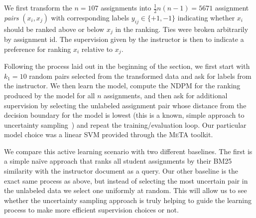 We first transform the $n = 107$ assignments into $\frac{1}{2}n(n-1) =
5671$ assignment \emph{pairs} $(x_i, x_j)$ with corresponding labels
$y_{ij} \in \{+1, -1\}$ indicating whether $x_i$ should be ranked above or
below $x_j$ in the ranking. Ties were broken arbitrarily by assignment id.
The supervision given by the instructor is then to indicate a preference
for ranking $x_i$ relative to $x_j$.

Following the process laid out in the beginning of the section, we first
start with $k_1 = 10$ random pairs selected from the transformed data and
ask for labels from the instructor. We then learn the model, compute the
NDPM for the ranking produced by the model for all $n$ assignments, and
then ask for additional supervision by selecting the unlabeled assignment
pair whose distance from the decision boundary for the model is lowest
(this is a known, simple approach to uncertainty
sampling~\cite{Settles:2012}) and repeat the training/evaluation loop. Our
particular model choice was a linear SVM provided through the \textsc{MeTA}
toolkit.

We compare this active learning scenario with two different baselines. The
first is a simple na\"ive approach that ranks all student assignments by
their BM25 similarity with the instructor document as a query. Our other
baseline is the exact same process as above, but instead of selecting the
most uncertain pair in the unlabeled data we select one uniformly at
random. This will allow us to see whether the uncertainty sampling approach
is truly helping to guide the learning process to make more efficient
supervision choices or not.

